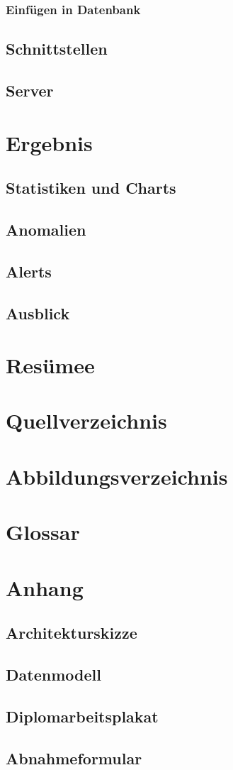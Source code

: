 \documentclass[pdftex,11pt,a4paper]{book}
\begin{document}
\subsection{Einfügen in Datenbank}
\section{Schnittstellen}
\section{Server}


\chapter{Ergebnis}
\section{Statistiken und Charts}
\section{Anomalien}
\section{Alerts}
\section{Ausblick}

\chapter{Resümee}


\chapter{Quellverzeichnis}

\chapter{Abbildungsverzeichnis}

\chapter{Glossar}

\chapter{Anhang}
\section{Architekturskizze}
\section{Datenmodell}
\section{Diplomarbeitsplakat}
\section{Abnahmeformular}
\end{document}
